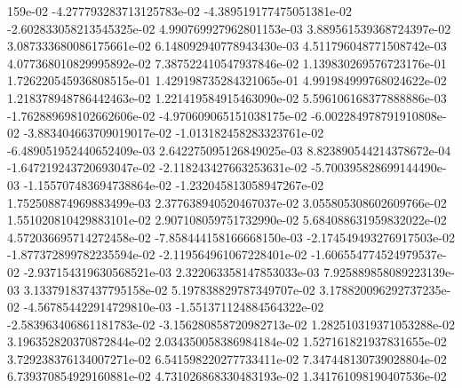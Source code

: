 159e-02	-4.277793283713125783e-02	-4.389519177475051381e-02	-2.602833058213545325e-02	4.990769927962801153e-03	3.889561539368724397e-02	3.087333680086175661e-02	6.148092940778943430e-03	4.511796048771508742e-03	4.077368010829995892e-02	7.387522410547937846e-02	1.139830269576723176e-01	1.726220545936808515e-01	1.429198735284321065e-01	4.991984999768024622e-02	1.218378948786442463e-02	1.221419584915463090e-02	5.596106168377888886e-03	-1.762889698102662606e-02	-4.970609065151038175e-02	-6.002284978791910808e-02	-3.883404663709019017e-02	-1.013182458283323761e-02	-6.489051952440652409e-03	2.642275095126849025e-03	8.823890544214378672e-04	-1.647219243720693047e-02	-2.118243427663253631e-02	-5.700395828699144490e-03	-1.155707483694738864e-02	-1.232045813058947267e-02	1.752508874969883499e-03	2.377638940520467037e-02	3.055805308602609766e-02	1.551020810429883101e-02	2.907108059751732990e-02	5.684088631959832022e-02	4.572036695714272458e-02	-7.858444158166668150e-03	-2.174549493276917503e-02	-1.877372899782235594e-02	-2.119564961067228401e-02	-1.606554774524979537e-02	-2.937154319630568521e-03	2.322063358147853033e-03	7.925889858089223139e-03	3.133791837437795158e-02	5.197838829787349707e-02	3.178820096292737235e-02	-4.567854422914729810e-03	-1.551371124884564322e-02	-2.583963406861181783e-02	-3.156280858720982713e-02	1.282510319371053288e-02	3.196352820370872844e-02	2.034350058386984184e-02	1.527161821937831655e-02	3.729238376134007271e-02	6.541598220277733411e-02	7.347448130739028804e-02	6.739370854929160881e-02	4.731026868330483193e-02	1.341761098190407536e-02
